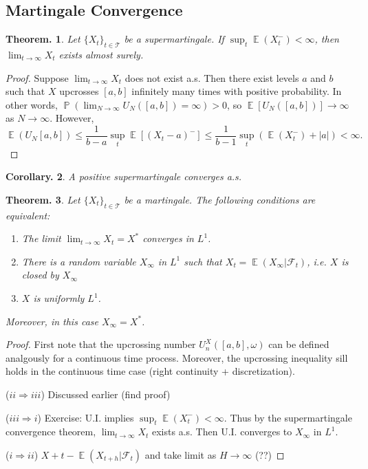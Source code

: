 \documentclass[11pt, a4paper]{memoir}
\newcommand{\imp}[2]{($#1\Rightarrow#2$)\hspace{0.2cm}}
\theoremstyle{change}
\newtheorem{theorem}{Theorem.}[section]
\newtheorem{corollary}[theorem]{Corollary.}
\theoremstyle{plain}
\theoremstyle{nonumberplain}
\newtheorem{proof}{Proof}
\DeclareMathOperator{\pr}{{\mathbb{P}}}
\DeclareMathOperator{\E}{{\mathbb{E}}}
\numberwithin{equation}{section}
\begin{document}
\subsection{Martingale Convergence}
\begin{theorem}
    Let $\{X_t\}_{t\in\mathcal{T}}$ be a supermartingale.
    If $\sup_t\E(X_t^-)<\infty$, then $\lim_{t\to\infty}X_t$ exists almost surely.
\end{theorem}
\begin{proof}
    Suppose $\lim_{t\to\infty}X_t$ does not exist a.s.
    Then there exist levels $a$ and $b$ such that $X$ upcrosses $[a,b]$ infinitely many times with positive probability.
    In other words, $\pr(\lim_{N\to\infty}U_N([a,b])=\infty)>0$, so $\E[U_N([a,b])]\to\infty$ as $N\to\infty$.
    However,
    \begin{equation*}
        \E(U_N[a,b])\leq\frac{1}{b-a}\sup_t\E[(X_t-a)^-]\leq\frac{1}{b-1}\sup_t(\E(X_t^-)+|a|)<\infty.
    \end{equation*}
\end{proof}
\begin{corollary}
    A positive supermartingale converges a.s.
\end{corollary}
\begin{theorem}
    Let $\{X_t\}_{t\in\mathcal{T}}$ be a martingale.
    The following conditions are equivalent:
    \begin{enumerate}[nl,r]
        \item The limit $\lim_{t\to\infty}X_t=X^*$ converges in $L^1$.
        \item There is a random variable $X_\infty$ in $L^1$ such that $X_t=\E(X_\infty|\mathcal{F}_t)$, i.e. $X$ is closed by $X_\infty$
        \item $X$ is uniformly $L^1$.
    \end{enumerate}
    Moreover, in this case $X_\infty=X^*$.
\end{theorem}
\begin{proof}
    First note that the upcrossing number $U_n^X([a,b],\omega)$ can be defined analgously for a continuous time process.
    Moreover, the upcrossing inequality sill holds in the continuous time case (right continuity + discretization).

    \imp{ii}{iii}
    Discussed earlier (find proof)

    \imp{iii}{i}
    Exercise: U.I. implies $\sup_t\E(X_t^-)<\infty$.
    Thus by the supermartingale convergence theorem, $\lim_{t\to\infty}X_t$ exists a.s.
    Then U.I. converges to $X_\infty$ in $L^1$.

    \imp{i}{ii}
    $X+t-\E(X_{t+h}|\mathcal{F}_t)$ and take limit as $H\to\infty$ (??)
\end{proof}
\end{document}
